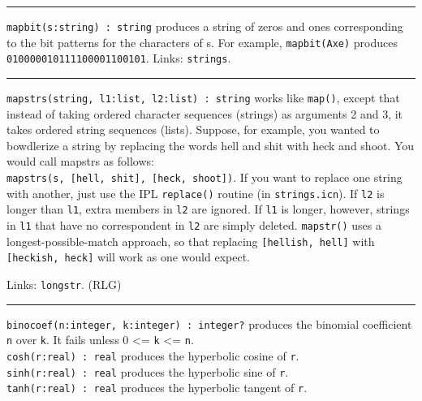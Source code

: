 \vspace{0.25cm}\hrule{}

\texttt{mapbit(s:string) : string} produces a string of zeros and ones
corresponding to the bit patterns for the characters of s. For example,
\texttt{mapbit({\textquotedbl}Axe{\textquotedbl})} produces
\texttt{{\textquotedbl}010000010111100001100101{\textquotedbl}}. Links:
\texttt{strings}. 

\vspace{0.25cm}\hrule{}

\texttt{mapstrs(string, l1:list, l2:list) : string} works like
\texttt{map()}, except that instead of taking ordered character
sequences (strings) as arguments 2 and 3, it takes ordered string
sequences (lists). Suppose, for example, you wanted to
bowdlerize a string by replacing the words
{\textquotedbl}hell{\textquotedbl} and
{\textquotedbl}shit{\textquotedbl} with
{\textquotedbl}heck{\textquotedbl} and
{\textquotedbl}shoot.{\textquotedbl} You would call mapstrs as
follows:\\
\texttt{mapstrs(s, [{\textquotedbl}hell{\textquotedbl},
{\textquotedbl}shit{\textquotedbl}],
[{\textquotedbl}heck{\textquotedbl},
{\textquotedbl}shoot{\textquotedbl}])}. If you want to replace one
string with another, just use the IPL \texttt{replace()} routine (in
\texttt{strings.icn}). If \texttt{l2} is longer than \texttt{l1}, extra
members in \texttt{l2} are ignored. If \texttt{l1} is longer, however,
strings in \texttt{l1} that have no correspondent in \texttt{l2} are
simply deleted. \texttt{mapstr()} uses a longest-possible-match
approach, so that replacing
\texttt{[{\textquotedbl}hellish{\textquotedbl},
{\textquotedbl}hell{\textquotedbl}]} with
\texttt{[{\textquotedbl}heckish{\textquotedbl},
{\textquotedbl}heck{\textquotedbl}]} will work as one would expect.

Links: \texttt{longstr}. (RLG)

\vspace{0.25cm}\hrule{}

\texttt{binocoef(n:integer, k:integer) : integer?} produces the
binomial coefficient \texttt{n} over
\texttt{k}. It fails unless 0 {\textless}= \texttt{k} {\textless}=
\texttt{n}.\\
\texttt{cosh(r:real) : real} produces the hyperbolic cosine of \texttt{r}.\\
\texttt{sinh(r:real) : real} produces the hyperbolic sine of
\texttt{r}.\\
\texttt{tanh(r:real) : real} produces the hyperbolic tangent of
\texttt{r}.

